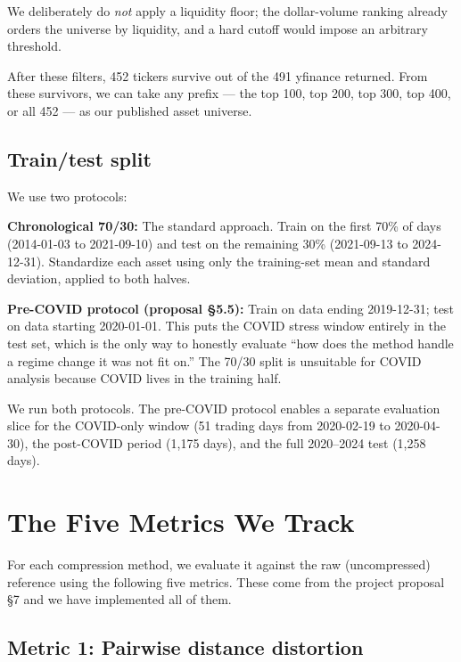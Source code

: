 \documentclass[11pt]{article}
\begin{document}
We deliberately do \emph{not} apply a liquidity floor; the dollar-volume ranking already orders the universe by liquidity, and a hard cutoff would impose an arbitrary threshold.

After these filters, 452 tickers survive out of the 491 yfinance returned. From these survivors, we can take any prefix --- the top 100, top 200, top 300, top 400, or all 452 --- as our published asset universe.

\subsection{Train/test split}

We use two protocols:

\textbf{Chronological 70/30:} The standard approach. Train on the first 70\% of days (2014-01-03 to 2021-09-10) and test on the remaining 30\% (2021-09-13 to 2024-12-31). Standardize each asset using only the training-set mean and standard deviation, applied to both halves.

\textbf{Pre-COVID protocol (proposal §5.5):} Train on data ending 2019-12-31; test on data starting 2020-01-01. This puts the COVID stress window entirely in the test set, which is the only way to honestly evaluate ``how does the method handle a regime change it was not fit on.'' The 70/30 split is unsuitable for COVID analysis because COVID lives in the training half.

We run both protocols. The pre-COVID protocol enables a separate evaluation slice for the COVID-only window (51 trading days from 2020-02-19 to 2020-04-30), the post-COVID period (1{,}175 days), and the full 2020--2024 test (1{,}258 days).

\newpage

\section{The Five Metrics We Track}

For each compression method, we evaluate it against the raw (uncompressed) reference using the following five metrics. These come from the project proposal §7 and we have implemented all of them.

\subsection{Metric 1: Pairwise distance distortion}
\end{document}
